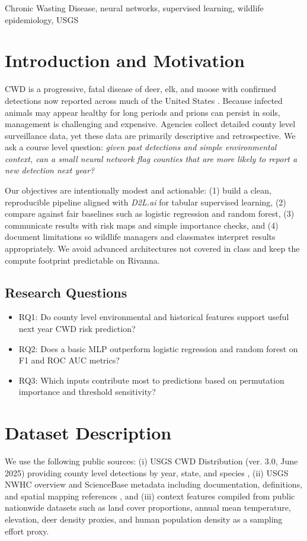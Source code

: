 \documentclass[conference]{IEEEtran}
\begin{document}
\begin{IEEEkeywords}
Chronic Wasting Disease, neural networks, supervised learning, wildlife epidemiology, USGS
\end{IEEEkeywords}

\section{Introduction and Motivation}
CWD is a progressive, fatal disease of deer, elk, and moose with confirmed detections now reported across much of the United States \cite{usgs2025}. Because infected animals may appear healthy for long periods and prions can persist in soils, management is challenging and expensive. Agencies collect detailed county level surveillance data, yet these data are primarily descriptive and retrospective. We ask a course level question: \textit{given past detections and simple environmental context, can a small neural network flag counties that are more likely to report a new detection next year?}

Our objectives are intentionally modest and actionable: (1) build a clean, reproducible pipeline aligned with \textit{D2L.ai} for tabular supervised learning, (2) compare against fair baselines such as logistic regression and random forest, (3) communicate results with risk maps and simple importance checks, and (4) document limitations so wildlife managers and classmates interpret results appropriately. We avoid advanced architectures not covered in class and keep the compute footprint predictable on Rivanna.

\subsection*{Research Questions}
\begin{itemize}
\item RQ1: Do county level environmental and historical features support useful next year CWD risk prediction?
\item RQ2: Does a basic MLP outperform logistic regression and random forest on F1 and ROC AUC metrics?
\item RQ3: Which inputs contribute most to predictions based on permutation importance and threshold sensitivity?
\end{itemize}

\section{Dataset Description}
We use the following public sources: (i) USGS CWD Distribution (ver. 3.0, June 2025) providing county level detections by year, state, and species \cite{usgs_data}, (ii) USGS NWHC overview and ScienceBase metadata including documentation, definitions, and spatial mapping references \cite{usgs2025,sciencebase_item}, and (iii) context features compiled from public nationwide datasets such as land cover proportions, annual mean temperature, elevation, deer density proxies, and human population density as a sampling effort proxy.
\end{document}
